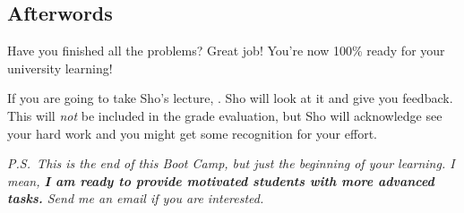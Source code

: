 \documentclass[11pt,pdfa,lastpage]{MishoNote}
\begin{document}
\vfill
\subsection*{Afterwords}

Have you finished all the problems? Great job! You're now 100\% ready for your university learning!

If you are going to take Sho's lecture, .
Sho will look at it and give you feedback. This will \emph{not} be included in the grade evaluation, but Sho will acknowledge see your hard work and you might get some recognition for your effort.


\vfill

\noindent
\emph{P.S.~This is the end of this Boot Camp, but just the beginning of your learning. I mean, \textbf{I am ready to provide motivated students with more advanced tasks.} Send me an email if you are interested.}
\end{document}
